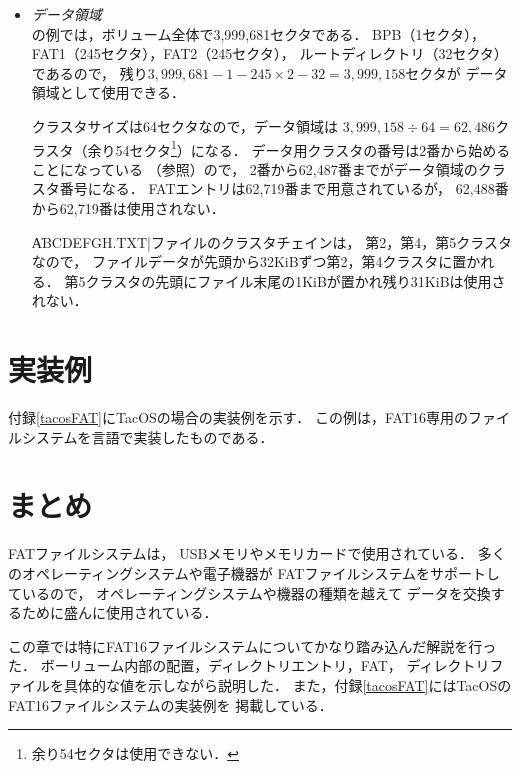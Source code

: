 \begin{itemize}
  ルートディレクトリの\|SAMPLE.DAT|エントリから，
  このファイルは第6クラスタから始まるクラスタチェインに格納されることが分かる．
  FATの内容を確認すると
  第6クラスタがチェインの最終クラスタなのでチェインの長さは1である．
  \|SAMPLE.DAT|ファイルのデータは第6クラスタに格納される．

\item \emph{データ領域}\\
  の例では，ボリューム全体で3,999,681セクタである．
  BPB（1セクタ），FAT1（245セクタ），FAT2（245セクタ），
  ルートディレクトリ（32セクタ）であるので，
  残り$3,999,681 - 1 - 245 \times 2 - 32 = 3,999,158$セクタが
  データ領域として使用できる．

  クラスタサイズは64セクタなので，データ領域は
  $3,999,158 \div 64 = 62,486$クラスタ（余り54セクタ\footnote{
      余り54セクタは使用できない．
  }）になる．
  データ用クラスタの番号は2番から始めることになっている
  （参照）ので，
  2番から62,487番までがデータ領域のクラスタ番号になる．
  FATエントリは62,719番まで用意されているが，
  62,488番から62,719番は使用されない．

  \|ABCDEFGH.TXT|ファイルのクラスタチェインは，
  第2，第4，第5クラスタなので，
  ファイルデータが先頭から32KiBずつ第2，第4クラスタに置かれる．
  第5クラスタの先頭にファイル末尾の1KiBが置かれ残り31KiBは使用されない．

\end{itemize}

\section{実装例}
付録\ref{tacosFAT}にTacOSの場合の実装例を示す．
この例は，FAT16専用のファイルシステムを{\cmm}言語で実装したものである．

\section{まとめ}
FATファイルシステムは，
USBメモリやメモリカードで使用されている．
多くのオペレーティングシステムや電子機器が
FATファイルシステムをサポートしているので，
オペレーティングシステムや機器の種類を越えて
データを交換するために盛んに使用されている．

この章では特にFAT16ファイルシステムについてかなり踏み込んだ解説を行った．
ボーリューム内部の配置，ディレクトリエントリ，FAT，
ディレクトリファイルを具体的な値を示しながら説明した．
また，付録\ref{tacosFAT}にはTacOSのFAT16ファイルシステムの実装例を
掲載している．

